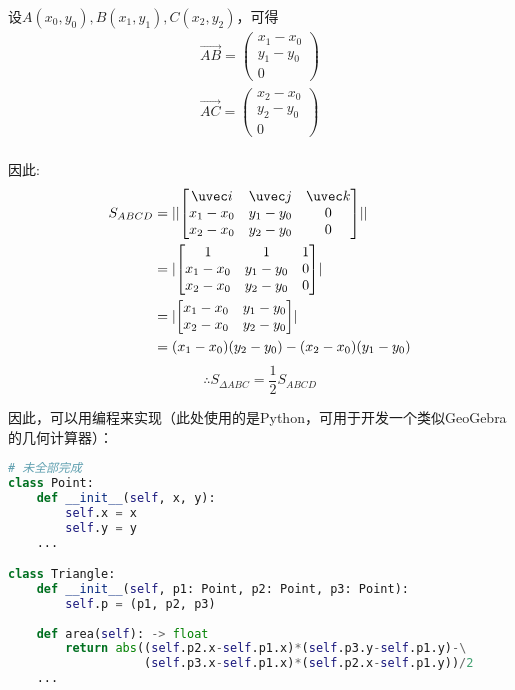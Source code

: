 设$A(x_0, y_0), B(x_1, y_1), C(x_2, y_2)$，可得
\begin{equation}
\begin{aligned}
\vec{AB}=\begin{pmatrix}x_1-x_0 \\ y_1-y_0\\0\end{pmatrix}\\
\vec{AC}=\begin{pmatrix}x_2-x_0 \\ y_2-y_0\\0\end{pmatrix}\\
\end{aligned}
\end{equation}

因此:
\begin{equation}
\begin{aligned}
S_{ABCD}&=\lvert\lvert \begin{bmatrix}
\uvec i & \uvec j & \uvec k \\
x_1-x_0 & y_1-y_0 & 0\\
x_2-x_0 & y_2-y_0 & 0
\end{bmatrix}\rvert\rvert \\
&= \lvert \begin{bmatrix}
1 & 1 & 1 \\
x_1-x_0 & y_1-y_0 & 0\\
x_2-x_0 & y_2-y_0 & 0
\end{bmatrix}\rvert\\
&= \lvert \begin{bmatrix}
x_1-x_0 & y_1-y_0 \\
x_2-x_0 & y_2-y_0 
\end{bmatrix}\rvert \\
&=(x_1-x_0)(y_2-y_0)-(x_2-x_0)(y_1-y_0)
\end{aligned}
\end{equation}
$$\therefore S_{\Delta ABC}=\frac{1}{2} S_{ABCD}$$

因此，可以用编程来实现（此处使用的是Python，可用于开发一个类似GeoGebra的几何计算器）：
\begin{lstlisting}[language=python]
# 未全部完成
class Point:
    def __init__(self, x, y):
        self.x = x
        self.y = y
    ...

class Triangle:
    def __init__(self, p1: Point, p2: Point, p3: Point):
        self.p = (p1, p2, p3)
    
    def area(self): -> float
        return abs((self.p2.x-self.p1.x)*(self.p3.y-self.p1.y)-\
                   (self.p3.x-self.p1.x)*(self.p2.x-self.p1.y))/2
    ...
\end{lstlisting}